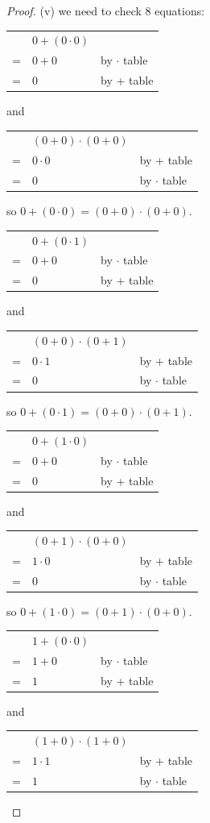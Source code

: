 \documentclass[14pt]{extarticle}
\newcommand{\cy}{\color{cyan}}
\begin{document}
\begin{proof}
(v) we need to check 8 equations:

\begin{tabular}{cll}
  & \(0 + (0 \cdot 0)\) & \\
= & \(0 + 0\) & {\cy by $\cdot$ table} \\
= & \(0\) & {\cy by + table}
\end{tabular}
and
\begin{tabular}{cll}
  & \((0 + 0) \cdot (0 + 0)\) & \\
= & \(0 \cdot 0\) & {\cy by + table} \\
= & \(0\) & {\cy by $\cdot$ table}
\end{tabular}

so \(0 + (0 \cdot 0) = (0 + 0) \cdot (0 + 0)\).

\begin{tabular}{cll}
  & \(0 + (0 \cdot 1)\) & \\
= & \(0 + 0\) & {\cy by $\cdot$ table} \\
= & \(0\) & {\cy by + table}
\end{tabular}
and
\begin{tabular}{cll}
  & \((0 + 0) \cdot (0 + 1)\) & \\
= & \(0 \cdot 1\) & {\cy by + table} \\
= & \(0\) & {\cy by $\cdot$ table}
\end{tabular}

so \(0 + (0 \cdot 1) = (0 + 0) \cdot (0 + 1)\).

\begin{tabular}{cll}
  & \(0 + (1 \cdot 0)\) & \\
= & \(0 + 0\) & {\cy by $\cdot$ table} \\
= & \(0\) & {\cy by + table}
\end{tabular}
and
\begin{tabular}{cll}
  & \((0 + 1) \cdot (0 + 0)\) & \\
= & \(1 \cdot 0\) & {\cy by + table} \\
= & \(0\) & {\cy by $\cdot$ table}
\end{tabular}

so \(0 + (1 \cdot 0) = (0 + 1) \cdot (0 + 0)\).

\begin{tabular}{cll}
  & \(1 + (0 \cdot 0)\) & \\
= & \(1 + 0\) & {\cy by $\cdot$ table} \\
= & \(1\) & {\cy by + table}
\end{tabular}
and
\begin{tabular}{cll}
  & \((1 + 0) \cdot (1 + 0)\) & \\
= & \(1 \cdot 1\) & {\cy by + table} \\
= & \(1\) & {\cy by $\cdot$ table}
\end{tabular}


\end{proof}
\end{document}
